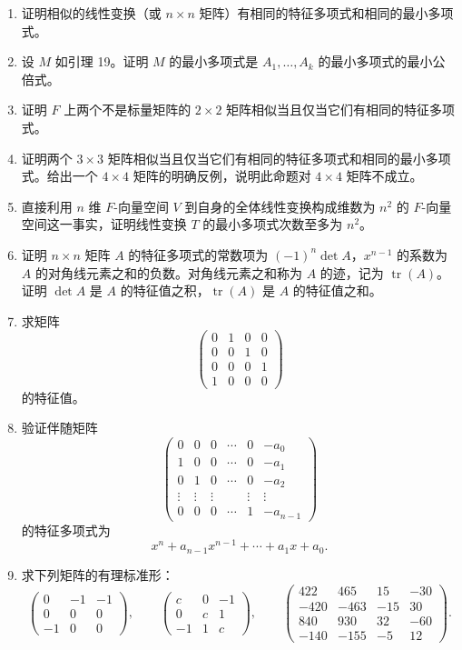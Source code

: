 \begin{enumerate}[label=\arabic*.]
\item 证明相似的线性变换（或 $n\times n$ 矩阵）有相同的特征多项式和相同的最小多项式。

\item 设 $M$ 如引理 19。证明 $M$ 的最小多项式是 $A_1,
\ldots,A_k$ 的最小多项式的最小公倍式。

\item 证明 $F$ 上两个不是标量矩阵的 $2\times2$ 矩阵相似当且仅当它们有相同的特征多项式。

\item 证明两个 $3\times3$ 矩阵相似当且仅当它们有相同的特征多项式和相同的最小多项式。给出一个 $4\times4$ 矩阵的明确反例，说明此命题对 $4\times4$ 矩阵不成立。

\item 直接利用 $n$ 维 $F$-向量空间 $V$ 到自身的全体线性变换构成维数为 $n^2$ 的 $F$-向量空间这一事实，证明线性变换 $T$ 的最小多项式次数至多为 $n^2$。

\item 证明 $n\times n$ 矩阵 $A$ 的特征多项式的常数项为 $(-1)^n\det A$，$x^{n-1}$ 的系数为 $A$ 的对角线元素之和的负数。对角线元素之和称为 $A$ 的迹，记为 $\operatorname{tr}(A)$。证明 $\det A$ 是 $A$ 的特征值之积，$\operatorname{tr}(A)$ 是 $A$ 的特征值之和。

\item 求矩阵
\[
\begin{pmatrix}
0&1&0&0\\
0&0&1&0\\
0&0&0&1\\
1&0&0&0
\end{pmatrix}
\]
的特征值。

\item 验证伴随矩阵
\[
\begin{pmatrix}
0&0&0&\cdots&0&-a_0\\
1&0&0&\cdots&0&-a_1\\
0&1&0&\cdots&0&-a_2\\
\vdots&\vdots&\vdots& &\vdots&\vdots\\
0&0&0&\cdots&1&-a_{n-1}
\end{pmatrix}
\]
的特征多项式为
\[
x^n+a_{n-1}x^{n-1}+\cdots+a_1x+a_0.
\]

\item 求下列矩阵的有理标准形：
\[
\begin{pmatrix}0&-1&-1\\0&0&0\\-1&0&0\end{pmatrix},\qquad
\begin{pmatrix}c&0&-1\\0&c&1\\-1&1&c\end{pmatrix},\qquad
\begin{pmatrix}
422&465&15&-30\\
-420&-463&-15&30\\
840&930&32&-60\\
-140&-155&-5&12
\end{pmatrix}.
\]


\end{enumerate}
